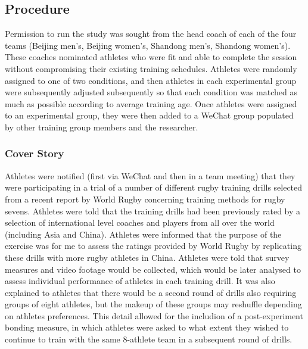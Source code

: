 \subsection{Procedure}
Permission to run the study was sought from the head coach of each of the four teams (Beijing men's, Beijing women's, Shandong men's, Shandong women's).  These coaches nominated athletes who were fit and able to complete the session without compromising their existing training schedules.  Athletes were randomly assigned to one of two conditions, and then athletes in each experimental group were subsequently adjusted subsequently so that each condition was matched as much as possible according to average training age. Once athletes were assigned to an experimental group, they were then added to a WeChat group populated by other training group members and the researcher.

\subsubsection{Cover Story}
Athletes were notified (first via WeChat and then in a team meeting) that they were participating in a trial of a number of different rugby training drills selected from a recent report by World Rugby concerning training methods for rugby sevens.  Athletes were told that the training drills had been previously rated by a selection of international level coaches and players from all over the world (including Asia and China).  Athletes were informed that the purpose of the exercise was for me to assess the ratings provided by World Rugby by replicating these drills with more rugby athletes in China.  Athletes were told that survey measures and video footage would be collected, which would be later analysed to assess individual performance of athletes in each training drill.  It was also explained to athletes that there would be a second round of drills also requiring groups of eight athletes, but the makeup of these groups may reshuffle depending on athletes preferences.  This detail allowed for the includion of a post-experiment bonding measure, in which athletes were asked to what extent they wished to continue to train with the same 8-athlete team in a subsequent round of drills.

